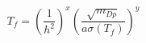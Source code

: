 \begin{equation}
T_f = \left (\frac{1}{h^2} \right )^x \left
( \frac{\sqrt{m_{Dp}}}{a \sigma(T_f)}\right )^y
\label{tFfinal}
\end{equation}

